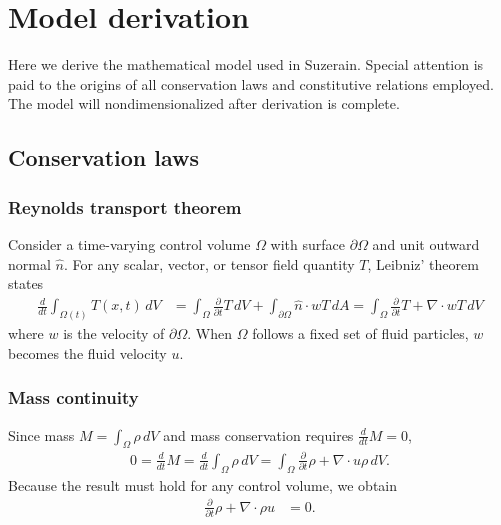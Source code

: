 \documentclass[letterpaper,11pt,nointlimits,reqno]{amsart}
\begin{document}
\section{Model derivation}
\label{sec:derivation}

Here we derive the mathematical model used in Suzerain.  Special attention is
paid to the origins of all conservation laws and constitutive relations
employed.  The model will nondimensionalized after derivation is complete.

\subsection{Conservation laws}

\subsubsection{Reynolds transport theorem}

Consider a time-varying control volume $\Omega$ with surface
$\partial\Omega$ and unit outward normal $\hat{n}$.  For any
scalar, vector, or tensor field quantity
$T$, Leibniz' theorem states
\begin{align}
  \label{eq:rtt}
  \frac{d}{dt}\int_{\Omega(t)}T(x,t)\,dV
  &=
  \int_{\Omega}\frac{\partial}{\partial{}t}T\,dV
  +
  \int_{\partial\Omega} \hat{n}\cdot{}w T\,dA
  =
  \int_{\Omega}\frac{\partial}{\partial{}t}T+\nabla\cdot{}wT\,dV
\end{align}
where $w$ is the velocity of $\partial\Omega$.  When $\Omega$ follows
a fixed set of fluid particles, $w$ becomes the fluid velocity $u$.

\subsubsection{Mass continuity}
Since mass $M=\int_{\Omega} \rho\,dV$
and mass conservation requires $\frac{d}{dt}M=0$,
\begin{align}
  0 = \frac{d}{dt}M
  = \frac{d}{dt}\int_{\Omega} \rho\,dV
  =
  \int_{\Omega}\frac{\partial}{\partial{}t}\rho+\nabla\cdot{}u\rho{}\,dV.
\end{align}
Because the result must hold for any control volume, we obtain
\begin{align}
  \label{eq:cons_mass}
  \frac{\partial}{\partial{}t}\rho+\nabla\cdot\rho{}u &= 0
  .
\end{align}
\end{document}
